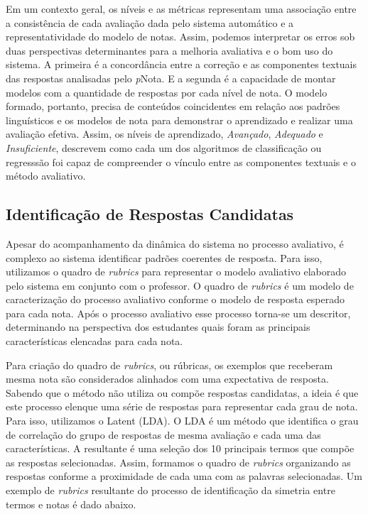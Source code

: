 Em um contexto geral, os níveis e as métricas representam uma associação entre a consistência de cada avaliação dada pelo sistema automático e a representatividade do modelo de notas. Assim, podemos interpretar os erros sob duas perspectivas determinantes para a melhoria avaliativa e o bom uso do sistema. A primeira é a concordância entre a correção e as componentes textuais das respostas analisadas pelo \textit{p}Nota. E a segunda é a capacidade de montar modelos com a quantidade de respostas por cada nível de nota. O modelo formado, portanto, precisa de conteúdos coincidentes em relação aos padrões linguísticos e os modelos de nota para demonstrar o aprendizado e realizar uma avaliação efetiva. Assim, os níveis de aprendizado, \textit{Avançado}, \textit{Adequado} e \textit{Insuficiente}, descrevem como cada um dos algoritmos de classificação ou regresssão foi capaz de compreender o vínculo entre as componentes textuais e o método avaliativo.

\subsection{Identificação de Respostas Candidatas}

Apesar do acompanhamento da dinâmica do sistema no processo avaliativo, é complexo ao sistema identificar padrões coerentes de resposta. Para isso, utilizamos o quadro de \textit{rubrics} para representar o modelo avaliativo elaborado pelo sistema em conjunto com o professor. O quadro de \textit{rubrics} é um modelo de caracterização do processo avaliativo conforme o modelo de resposta esperado para cada nota. Após o processo avaliativo esse processo torna-se um descritor, determinando na perspectiva dos estudantes quais foram as principais características elencadas para cada nota. 

Para criação do quadro de \textit{rubrics}, ou rúbricas, os exemplos que receberam mesma nota são considerados alinhados com uma expectativa de resposta. Sabendo que o método não utiliza ou compõe respostas candidatas, a ideia é que este processo elenque uma série de respostas para representar cada grau de nota. Para isso, utilizamos o Latent (LDA). O LDA é um método que identifica o grau de correlação do grupo de respostas de mesma avaliação e cada uma das características. A resultante é uma seleção dos 10 principais termos que compõe as respostas selecionadas. Assim, formamos o quadro de \textit{rubrics} organizando as respostas conforme a proximidade de cada uma com as palavras selecionadas. Um exemplo de \textit{rubrics} resultante do processo de identificação da simetria entre termos e notas é dado abaixo. 

